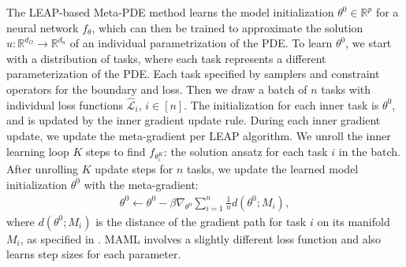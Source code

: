

The LEAP-based Meta-PDE method learns the model initialization $\theta^0 \in \mathbb{R}^p$ for a neural network $f_\theta$, which can then be trained to approximate the solution $u: \mathbb{R}^{d_\Omega} \to \mathbb{R}^{d_u}$ of an individual parametrization of the PDE. To learn $\theta^0$, we start with a distribution of tasks, where each task represents a different parameterization of the PDE. Each task specified by samplers and constraint operators for the boundary and loss. Then we draw a batch of $n$ tasks with individual loss functions $\hat{\mathcal{L}}_i$, $i \in [n]$. The initialization for each inner task is $\theta^0$, and is updated by the inner gradient update rule. During each inner gradient update, we update the meta-gradient per LEAP algorithm. We unroll the inner learning loop $K$ steps to find $f_{\theta_i^K}$: the solution ansatz for each task $i$ in the batch. After unrolling $K$ update steps for $n$ tasks, we update the learned model initialization $\theta^0$ with the meta-gradient:
\begin{align}
    \theta^0 \leftarrow \theta^0 - \beta \nabla_{\theta^0}\sum_{i=1}^n \frac{1}{n} d(\theta^0; M_i),
\end{align}
where $d(\theta^0; M_i)$ is the distance of the gradient path for task $i$ on its manifold $M_i$, as specified in \citep{flennerhag2018transferring}. MAML involves a slightly different loss function and also learns step sizes for each parameter.


